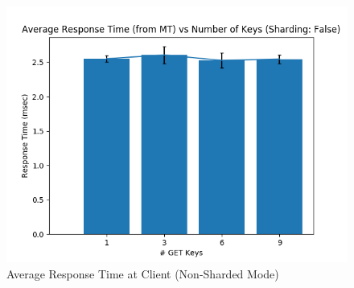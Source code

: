\documentclass[11pt,a4paper]{article}
\begin{document}
	\begin{figure}[H]
		\captionsetup{font=scriptsize,labelfont=scriptsize,justification=centering}
		\centering
		\includegraphics[scale=0.5]{images/5_shard_False_avg_r_times_mt.png}
		\caption{Average Response Time at Client (Non-Sharded Mode)}
	\end{figure}
	
\end{document}
